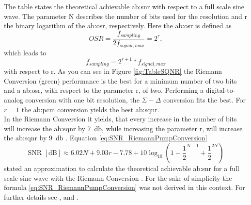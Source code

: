 The table states the theoretical achievable \gls{ab:snr} with respect to a full scale sine wave.
The parameter N describes the number of bits used for the resolution and r the binary logarithm of the \gls{ab:osr}, respectively.
Here the \gls{ab:osr} is defined as
\begin{equation}
OSR =  \frac{f_{sampling}}{2 f_{signal,max}} = 2^r,
\end{equation}
which leads to
\begin{equation}
f_{sampling} =  2^{r+1}*f_{signal,max}
\end{equation}
with respect to r.
As you can see in Figure \ref{fig:TableSQNR} the Riemann Conversion (green) performance is the best for a minimum number of two bits and a \gls{ab:osr}, with respect to the parameter r, of two.
Performing a digital-to-analog conversion with one bit resolution, the $\Sigma - \Delta$ conversion fits the best.
For $ r = 1$ the \gls{ab:pcm} conversion yields the best \gls{ab:sqnr}.\\
In the Riemann Conversion it yields, that every increase in the number of bits will increase the \gls{ab:sqnr} by \SI{7}{\decibel}, while increasing the parameter r, will increase the \gls{ab:sqnr} by \SI{9}{\decibel} \cite{VeyracRivetDevalEtAl2016}.
Equation \ref{eq:SNR_RiemannPumpConversion}
\begin{equation}
	\text{SNR } [\si{\dB}] \approx 6.02N + 9.03r - 7.78 + 10\log_{10}(1 - \frac{1}{2}^{N-1} + \frac{1}{2}^{2N})
	\label{eq:SNR_RiemannPumpConversion}
\end{equation}
stated an approximation to calculate the theoretical achievable \gls{ab:snr} for a full scale sine wave with the Riemann Conversion \citep{DevalRivetVeyrac2015}.
For the sake of simplicity the formula \ref{eq:SNR_RiemannPumpConversion} was not derived in this context.
For further details see \cite{VeyracRivetDevalEtAl2014},\cite{VeyracRivetDevalEtAl2016} and \cite{Kester2009}.

